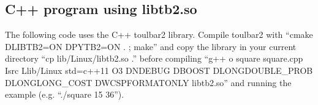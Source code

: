 \documentclass[letterpaper,10pt,openany,oneside,english]{sphinxmanual}
\begin{document}
\begin{sphinxVerbatim}[commandchars=\\\{\}]
  
 
	   
		  
		   
			  
			     
				 \PYG{p}{[}\PYG{p}{]}\PYG{p}{[}\PYG{p}{]}      \PYG{p}{[}\PYG{p}{]}\PYG{p}{[}\PYG{p}{]}    \PYG{p}{[}\PYG{p}{]}\PYG{p}{[}\PYG{p}{]}\PYG{o}{/}      \PYG{p}{[}\PYG{p}{]}\PYG{p}{[}\PYG{p}{]}\PYG{o}{/}  
					\PYG{n}{row}  \PYG{p}{[}\PYG{p}{]}    
\end{sphinxVerbatim}


\subsection{C++ program using libtb2.so}
\label{\detokenize{examples/tuto_spp:c-program-using-libtb2-so}}
\sphinxAtStartPar
The following code uses the C++ toulbar2 library. Compile toulbar2 with “cmake \sphinxhyphen{}DLIBTB2=ON \sphinxhyphen{}DPYTB2=ON . ; make” and copy the library in your current directory “cp lib/Linux/libtb2.so .” before compiling “g++ \sphinxhyphen{}o square square.cpp \sphinxhyphen{}Isrc \sphinxhyphen{}Llib/Linux \sphinxhyphen{}std=c++11 \sphinxhyphen{}O3 \sphinxhyphen{}DNDEBUG \sphinxhyphen{}DBOOST \sphinxhyphen{}DLONGDOUBLE\_PROB \sphinxhyphen{}DLONGLONG\_COST \sphinxhyphen{}DWCSPFORMATONLY libtb2.so” and running the example (e.g. “./square 15 36”).
\end{document}
